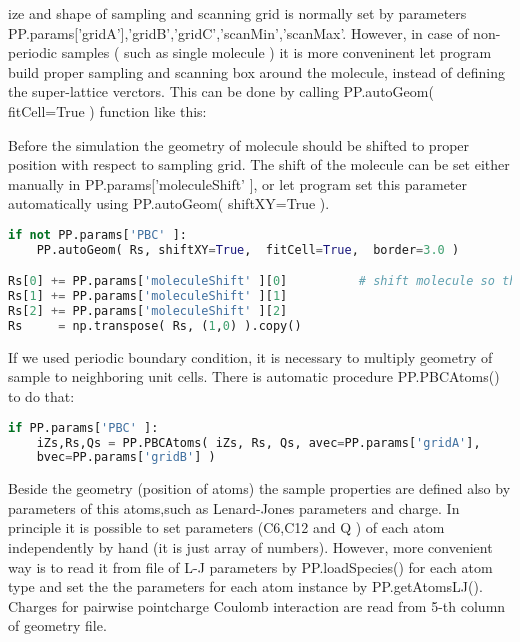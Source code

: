 ize and shape of sampling and scanning grid is normally set by parameters
PP.params['gridA'],'gridB','gridC','scanMin','scanMax'. However, in case of
non-periodic samples ( such as single molecule ) it is more conveninent let
program build proper sampling and scanning box around the molecule, instead of
defining the super-lattice verctors. This can be done by calling PP.autoGeom(
fitCell=True ) function like this:

Before the simulation the geometry of molecule should be shifted to proper
position with respect to sampling grid. The shift of the molecule can be set
either manually in PP.params['moleculeShift' ], or let program set this
parameter automatically using PP.autoGeom( shiftXY=True ). 

        
        
\begin{shadedbox}
    \begin{lstlisting}[language=python]
if not PP.params['PBC' ]:
    PP.autoGeom( Rs, shiftXY=True,  fitCell=True,  border=3.0 )

Rs[0] += PP.params['moleculeShift' ][0]          # shift molecule so that we sample reasonable part of potential 
Rs[1] += PP.params['moleculeShift' ][1]          
Rs[2] += PP.params['moleculeShift' ][2]          
Rs     = np.transpose( Rs, (1,0) ).copy() 

   \end{lstlisting}
\end{shadedbox}

If we used periodic boundary condition, it is necessary to multiply geometry of
sample to neighboring unit cells. There is automatic procedure PP.PBCAtoms() to
do that:

\begin{shadedbox}
    \begin{lstlisting}[language=python]
if PP.params['PBC' ]:
    iZs,Rs,Qs = PP.PBCAtoms( iZs, Rs, Qs, avec=PP.params['gridA'],
    bvec=PP.params['gridB'] )
   \end{lstlisting}
\end{shadedbox}


Beside the geometry (position of atoms) the sample properties are defined also
by parameters of this atoms,such as Lenard-Jones parameters and charge. In
principle it is possible to set parameters (C6,C12 and Q ) of each atom
independently by hand (it is just array of numbers). However, more convenient
way is to read it from file of L-J parameters by PP.loadSpecies() for each atom
type and set the the parameters for each atom instance by PP.getAtomsLJ().
Charges for pairwise pointcharge Coulomb interaction are read from 5-th column
of geometry file.

